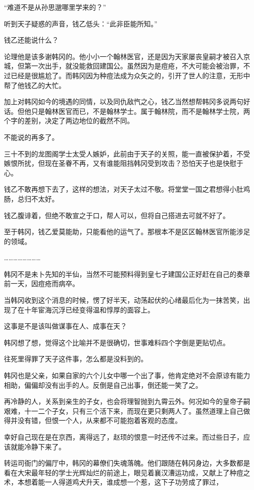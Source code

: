 “难道不是从孙思邈哪里学来的？”

听到天子疑惑的声音，钱乙低头：“此非臣能所知。”

钱乙还能说什么？

论理他是该多谢韩冈的。他小小一个翰林医官，还是因为天家屡丧皇嗣才被召入京城，但第一次出手，就没能救回建国公。虽然因为是痘疮，不大可能会被治罪，不过已经是很尴尬了。而韩冈因为种痘法成为众矢之的，引开了世人的注意，无形中帮了他钱乙的大忙。

加上对韩冈如今的境遇的同情，以及同仇敌忾之心，钱乙当然想帮韩冈多说两句好话。但他只是翰林医官而已，不是翰林学士。属于翰林院，而不是翰林学士院，两个字的差别，决定了两边地位的截然不同。

不能说的再多了。

三十不到的龙图阁学士太受人嫉妒，此前由于天子的关照，能一直被保护着，不受嫉恨所扰，但现在圣眷不再，又有谁能阻挡韩冈受到攻击？恐怕天子也是快慰于心。

钱乙不敢再想下去了，这样的想法，对天子太过不敬。将堂堂一国之君想得小肚鸡肠，总归不太好。

钱乙腹诽着，但绝不敢宣之于口，帮人可以，但将自己搭进去可就不好了。

至于韩冈，钱乙爱莫能助，只能看他的运气了。那根本不是区区翰林医官所能涉足的领域。

……………………

韩冈不是未卜先知的半仙，当然不可能预料得到皇七子建国公正好赶在自己的奏章前一天，因痘疮而病卒。

当韩冈收到这个消息的时候，愣了好半天，动荡起伏的心绪最后化为一抹苦笑，出现了在十年宦海沉浮已经变得温和惇厚的面容上。

这事是不是该叫做谋事在人、成事在天？

韩冈想了想，觉得这个比喻并不是很确切，世事难料四个字倒是更贴切点。

往死里得罪了天子这件事，怎么都是没料到的。

韩冈也是父亲，如果自家的六个儿女中哪一个出了事，他肯定绝对不会原谅有能力相助，偏偏却没有出手的人。反倒是自己出事，倒还能一笑了之。

再冷静的人，关系到亲生的子女，也会将理智抛到九霄云外。何况如今的皇帝子嗣艰难，十一二个子女，只有三个活下来，而现在更只剩两人了。虽然道理上自己做得并没有错，但恨一个人，从来都不可能抱着客观的态度。

幸好自己现在是在京西，离得远了，赵顼的恨意一时还传不过来。而过些日子，应该就能冷静下来了。

转运司衙门的偏厅中，韩冈的幕僚们失魂落魄。他们跟随在韩冈身边，大多数都是看在大宋最年轻的学士光辉灿烂的前途上，眼见着襄汉漕运功成，又献上了种痘之术，本想着能一人得道鸡犬升天，谁成想一个惹，这下子功劳成了罪过，

